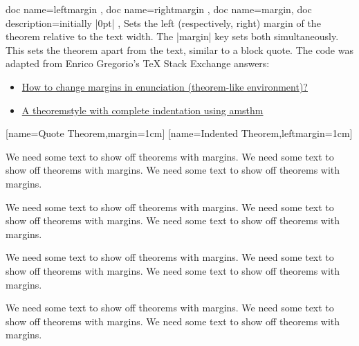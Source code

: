 \documentclass{ltxdoc}
\begin{document}
\begin{docKeys}[doc parameter={=\meta{length}}]
  {
    { doc name=leftmargin },
    { doc name=rightmargin },
    { doc name=margin, doc description=initially |0pt| },
  }
Sets the left (respectively, right) margin of the theorem relative to the text width.
The |margin| key sets both simultaneously.
This sets the theorem apart from the text, similar to a block quote.
The code was adapted from Enrico Gregorio's \TeX{} Stack Exchange answers:
\begin{itemize}
	\item \href{https://tex.stackexchange.com/a/67251/208544}{How to change margins in enunciation (theorem-like environment)?}
	\item \href{https://tex.stackexchange.com/a/236407/208544}{A theoremstyle with complete indentation using amsthm}
\end{itemize}
\begin{codepreamble}
\newcommand{\marginthmtext}{%
  We need some text to show off theorems with margins. }
[name=Quote Theorem,margin=1cm]
[name=Indented Theorem,leftmargin=1cm]
\end{codepreamble}

\newcommand{\marginthmtext}{We need some text to show off theorems with margins. }
\begin{keythmscode}[withpreamble]
\marginthmtext\marginthmtext\marginthmtext

\begin{quotethm}
\marginthmtext\marginthmtext\marginthmtext
\end{quotethm}

\marginthmtext\marginthmtext\marginthmtext

\begin{indentedthm}
\marginthmtext\marginthmtext\marginthmtext
\end{indentedthm}
\end{keythmscode}

\end{docKeys}
\end{document}
